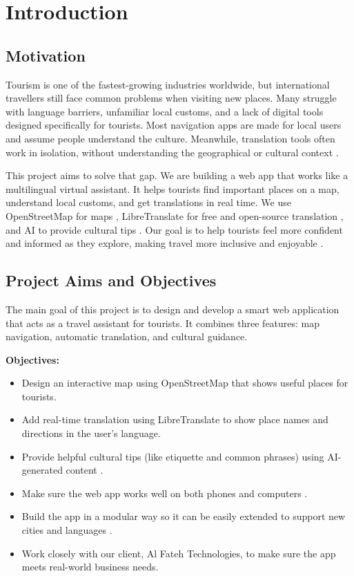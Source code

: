 \chapter{Introduction}

\section{Motivation}

Tourism is one of the fastest-growing industries worldwide, but international travellers still face common problems when visiting new places. Many struggle with language barriers, unfamiliar local customs, and a lack of digital tools designed specifically for tourists. Most navigation apps are made for local users and assume people understand the culture. Meanwhile, translation tools often work in isolation, without understanding the geographical or cultural context \cite{navUX,localizationUX}.

This project aims to solve that gap. We are building a web app that works like a multilingual virtual assistant. It helps tourists find important places on a map, understand local customs, and get translations in real time. We use OpenStreetMap for maps \cite{osm}, LibreTranslate for free and open-source translation \cite{libretranslate}, and AI to provide cultural tips \cite{cultureai}. Our goal is to help tourists feel more confident and informed as they explore, making travel more inclusive and enjoyable \cite{inclusiveTourism}.

\section{Project Aims and Objectives}

The main goal of this project is to design and develop a smart web application that acts as a travel assistant for tourists. It combines three features: map navigation, automatic translation, and cultural guidance.

\textbf{Objectives:}
\begin{itemize}
  \item Design an interactive map using OpenStreetMap that shows useful places for tourists.
  \item Add real-time translation using LibreTranslate to show place names and directions in the user’s language.
  \item Provide helpful cultural tips (like etiquette and common phrases) using AI-generated content \cite{gpt_culturetips}.
  \item Make sure the web app works well on both phones and computers \cite{responsiveDesign}.
  \item Build the app in a modular way so it can be easily extended to support new cities and languages \cite{modularApps}.
  \item Work closely with our client, Al Fateh Technologies, to make sure the app meets real-world business needs.
\end{itemize}

